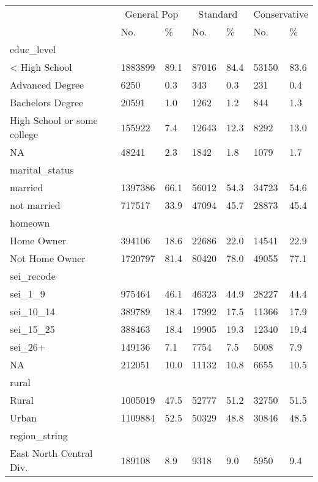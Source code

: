\captionsetup[table]{labelformat=empty,skip=1pt}
\begin{longtable}{lllllll}
\toprule
& \multicolumn{2}{c}{General Pop} & \multicolumn{2}{c}{Standard} & \multicolumn{2}{c}{Conservative} \\ 
 \cmidrule(lr){2-3}\cmidrule(lr){4-5}\cmidrule(lr){6-7}
 & No. & \% & No. & \% & No. & \% \\ 
\midrule
\multicolumn{1}{l}{educ\_level} \\ 
\midrule
< High School & 1883899 & 89.1 & 87016 & 84.4 & 53150 & 83.6 \\ 
Advanced Degree & 6250 & 0.3 & 343 & 0.3 & 231 & 0.4 \\ 
Bachelors Degree & 20591 & 1.0 & 1262 & 1.2 & 844 & 1.3 \\ 
High School or some college & 155922 & 7.4 & 12643 & 12.3 & 8292 & 13.0 \\ 
NA & 48241 & 2.3 & 1842 & 1.8 & 1079 & 1.7 \\ 
\midrule
\multicolumn{1}{l}{marital\_status} \\ 
\midrule
married & 1397386 & 66.1 & 56012 & 54.3 & 34723 & 54.6 \\ 
not married & 717517 & 33.9 & 47094 & 45.7 & 28873 & 45.4 \\ 
\midrule
\multicolumn{1}{l}{homeown} \\ 
\midrule
Home Owner & 394106 & 18.6 & 22686 & 22.0 & 14541 & 22.9 \\ 
Not Home Owner & 1720797 & 81.4 & 80420 & 78.0 & 49055 & 77.1 \\ 
\midrule
\multicolumn{1}{l}{sei\_recode} \\ 
\midrule
sei\_1\_9 & 975464 & 46.1 & 46323 & 44.9 & 28227 & 44.4 \\ 
sei\_10\_14 & 389789 & 18.4 & 17992 & 17.5 & 11366 & 17.9 \\ 
sei\_15\_25 & 388463 & 18.4 & 19905 & 19.3 & 12340 & 19.4 \\ 
sei\_26+ & 149136 & 7.1 & 7754 & 7.5 & 5008 & 7.9 \\ 
NA & 212051 & 10.0 & 11132 & 10.8 & 6655 & 10.5 \\ 
\midrule
\multicolumn{1}{l}{rural} \\ 
\midrule
Rural & 1005019 & 47.5 & 52777 & 51.2 & 32750 & 51.5 \\ 
Urban & 1109884 & 52.5 & 50329 & 48.8 & 30846 & 48.5 \\ 
\midrule
\multicolumn{1}{l}{region\_string} \\ 
\midrule
East North Central Div. & 189108 & 8.9 & 9318 & 9.0 & 5950 & 9.4 \\ 

\end{longtable}
